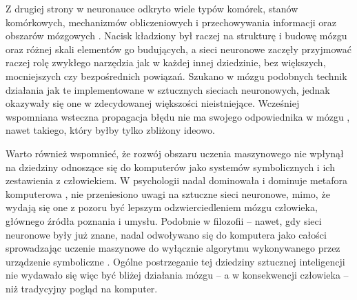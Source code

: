 Z drugiej strony w neuronauce odkryto wiele typów komórek, stanów komórkowych, mechanizmów obliczeniowych i przechowywania informacji oraz obszarów mózgowych \cite{solari2011cognitive}.
Nacisk kładziony był raczej na strukturę i budowę mózgu oraz różnej skali elementów go budujących, a sieci neuronowe zaczęły przyjmować raczej rolę zwykłego narzędzia jak w każdej innej dziedzinie, bez większych, mocniejszych czy bezpośrednich powiązań.
Szukano w mózgu podobnych technik działania jak te implementowane w sztucznych sieciach neuronowych, jednak okazywały się one w zdecydowanej większości nieistniejące.
Wcześniej wspomniana wsteczna propagacja błędu nie ma swojego odpowiednika w mózgu \cite{hassabis2017neuroscience}, nawet takiego, który byłby tylko zbliżony ideowo.

Warto również wspomnieć, że rozwój obszaru uczenia maszynowego nie wpłynął na dziedziny odnoszące się do komputerów jako systemów symbolicznych i ich zestawienia z człowiekiem.
W psychologii nadal dominowała i dominuje metafora komputerowa \cite{casey1989computational}, nie przeniesiono uwagi na sztuczne sieci neuronowe, mimo, że wydają się one z pozoru być lepszym odzwierciedleniem mózgu człowieka, głównego źródła poznania i umysłu.
Podobnie w filozofii -- nawet, gdy sieci neuronowe były już znane, nadal odwoływano się do komputera jako całości sprowadzając uczenie maszynowe do wyłącznie algorytmu wykonywanego przez urządzenie symboliczne \cite{searle1980minds}.
Ogólne postrzeganie tej dziedziny sztucznej inteligencji nie wydawało się więc być bliżej działania mózgu -- a w konsekwencji człowieka -- niż tradycyjny pogląd na komputer.
